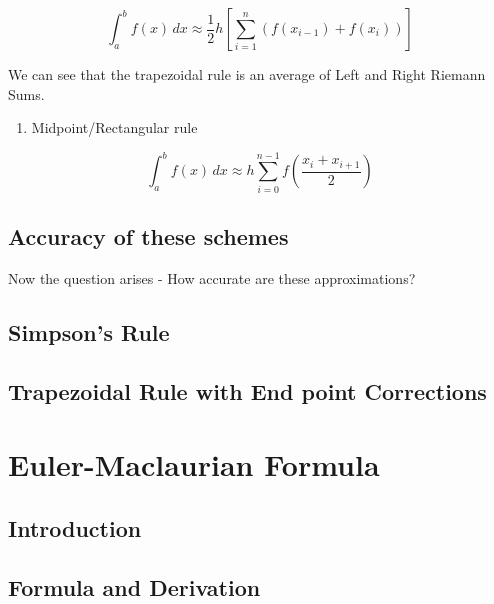 \documentclass[
]{book}
\providecommand{\tightlist}{%
  \setlength{\itemsep}{0pt}\setlength{\parskip}{0pt}}
\begin{document}
\begin{equation}
\int_a^b f(x) \, dx \approx \frac{1}{2} h \left[ \sum_{i=1}^n (f(x_{i-1})+f(x_i)) \right]
\end{equation}

We can see that the trapezoidal rule is an average of Left and Right Riemann Sums.

\begin{enumerate}
\def\labelenumi{\arabic{enumi}.}
\setcounter{enumi}{3}
\tightlist
\item
  Midpoint/Rectangular rule
\end{enumerate}

\begin{equation}
\int_a^b f(x) \, dx \approx h \sum_{i=0}^{n-1} f\left( \frac{x_i+x_{i+1}}{2} \right) 
\end{equation}

\hypertarget{accuracy-of-these-schemes}{%
\subsection{Accuracy of these schemes}\label{accuracy-of-these-schemes}}

Now the question arises - How accurate are these approximations?

\hypertarget{simpsons-rule}{%
\subsection{Simpson's Rule}\label{simpsons-rule}}

\hypertarget{trapezoidal-rule-with-end-point-corrections}{%
\subsection{Trapezoidal Rule with End point Corrections}\label{trapezoidal-rule-with-end-point-corrections}}

\hypertarget{euler-maclaurian-formula}{%
\section{Euler-Maclaurian Formula}\label{euler-maclaurian-formula}}

\hypertarget{introduction-1}{%
\subsection{Introduction}\label{introduction-1}}

\hypertarget{formula-and-derivation}{%
\subsection{Formula and Derivation}\label{formula-and-derivation}}
\end{document}
